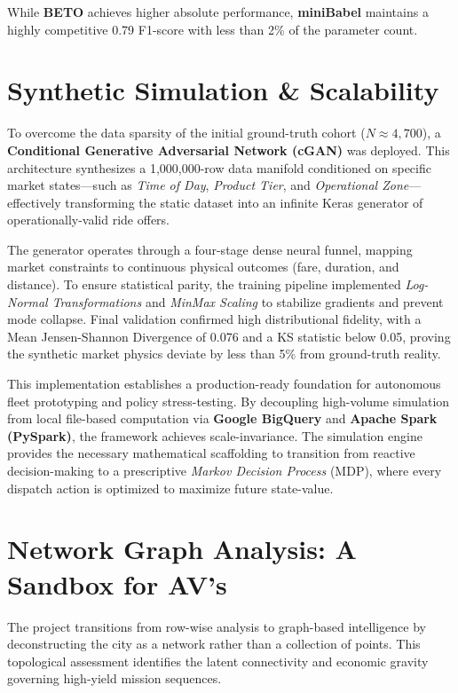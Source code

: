 \documentclass[10pt, letterpaper]{article}
\begin{document}
\noindent While \textbf{BETO} achieves higher absolute performance, \textbf{miniBabel} maintains a highly competitive 0.79 F1-score with less than 2\% of the parameter count. 



\section{Synthetic Simulation \& Scalability}

To overcome the data sparsity of the initial ground-truth cohort ($N \approx 4,700$), a \textbf{Conditional Generative Adversarial Network (cGAN)} was deployed. This architecture synthesizes a 1,000,000-row data manifold conditioned on specific market states—such as \textit{Time of Day}, \textit{Product Tier}, and \textit{Operational Zone}—effectively transforming the static dataset into an infinite Keras generator of operationally-valid ride offers.

The generator operates through a four-stage dense neural funnel, mapping market constraints to continuous physical outcomes (fare, duration, and distance). To ensure statistical parity, the training pipeline implemented \textit{Log-Normal Transformations} and \textit{MinMax Scaling} to stabilize gradients and prevent mode collapse. Final validation confirmed high distributional fidelity, with a Mean Jensen-Shannon Divergence of 0.076 and a KS statistic below 0.05, proving the synthetic market physics deviate by less than 5\% from ground-truth reality.

This implementation establishes a production-ready foundation for autonomous fleet prototyping and policy stress-testing. By decoupling high-volume simulation from local file-based computation via \textbf{Google BigQuery} and \textbf{Apache Spark (PySpark)}, the framework achieves scale-invariance. The simulation engine provides the necessary mathematical scaffolding to transition from reactive decision-making to a prescriptive \textit{Markov Decision Process} (MDP), where every dispatch action is optimized to maximize future state-value.



\section{Network Graph Analysis: A Sandbox for AV's}

The project transitions from row-wise analysis to graph-based intelligence by deconstructing the city as a network rather than a collection of points. This topological assessment identifies the latent connectivity and economic gravity governing high-yield mission sequences.
\end{document}
